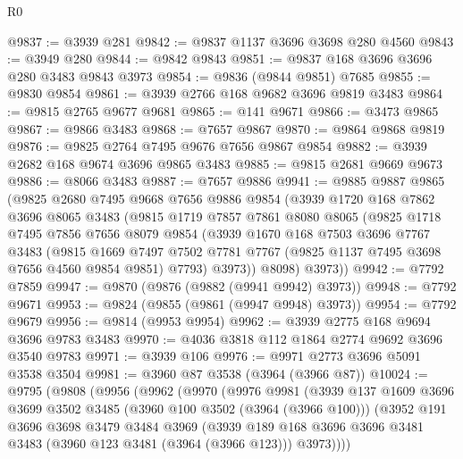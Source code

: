 \begin{lexlean}{R0}
\begin{coremodule}
@9837 := @3939 @281
@9842 := @9837 @1137 @3696 @3698 @280 @4560
@9843 := @3949 @280
@9844 := @9842 @9843
@9851 := @9837 @168 @3696 @3696 @280 @3483 @9843 @3973
@9854 := @9836 (@9844 @9851) @7685
@9855 := @9830 @9854
@9861 := @3939 @2766 @168 @9682 @3696 @9819 @3483
@9864 := @9815 @2765 @9677 @9681
@9865 := @141 @9671
@9866 := @3473 @9865
@9867 := @9866 @3483
@9868 := @7657 @9867
@9870 := @9864 @9868 @9819
@9876 := @9825 @2764 @7495 @9676 @7656 @9867 @9854
@9882 := @3939 @2682 @168 @9674 @3696 @9865 @3483
@9885 := @9815 @2681 @9669 @9673
@9886 := @8066 @3483
@9887 := @7657 @9886
@9941 := @9885
    @9887
    @9865
    (@9825
      @2680
      @7495
      @9668
      @7656
      @9886
      @9854
      (@3939
        @1720
        @168
        @7862
        @3696
        @8065
        @3483
        (@9815
          @1719
          @7857
          @7861
          @8080
          @8065
          (@9825
            @1718
            @7495
            @7856
            @7656
            @8079
            @9854
            (@3939
              @1670
              @168
              @7503
              @3696
              @7767
              @3483
              (@9815
                @1669
                @7497
                @7502
                @7781
                @7767
                (@9825 @1137 @7495 @3698 @7656 @4560 @9854 @9851)
                @7793)
              @3973))
          @8098)
        @3973))
@9942 := @7792 @7859
@9947 := @9870 (@9876 (@9882 (@9941 @9942) @3973))
@9948 := @7792 @9671
@9953 := @9824 (@9855 (@9861 (@9947 @9948) @3973))
@9954 := @7792 @9679
@9956 := @9814 (@9953 @9954)
@9962 := @3939 @2775 @168 @9694 @3696 @9783 @3483
@9970 := @4036 @3818 @112 @1864 @2774 @9692 @3696 @3540 @9783
@9971 := @3939 @106
@9976 := @9971 @2773 @3696 @5091 @3538 @3504
@9981 := @3960 @87 @3538 (@3964 (@3966 @87))
@10024 := @9795
    (@9808
      (@9956
        (@9962
          (@9970
            (@9976
              @9981
              (@3939
                @137
                @1609
                @3696
                @3699
                @3502
                @3485
                (@3960 @100 @3502 (@3964 (@3966 @100)))
                (@3952
                  @191
                  @3696
                  @3698
                  @3479
                  @3484
                  @3969
                  (@3939
                    @189
                    @168
                    @3696
                    @3696
                    @3481
                    @3483
                    (@3960 @123 @3481 (@3964 (@3966 @123)))
                    @3973))))

\end{coremodule}
\end{lexlean}
